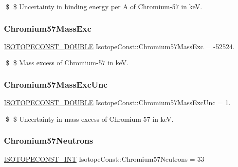 \$ \$ Uncertainty in binding energy per A of Chromium-\/57 in keV. \mbox{\label{group___isotope_const-_chromium-_cr57_ga9b7cb21fc04ce8d3d9797975cf0785dd}} 
\subsubsection{\texorpdfstring{Chromium57\+Mass\+Exc}{Chromium57MassExc}}
{\footnotesize\ttfamily \mbox{\hyperlink{group___isotope_const-_macros_ga8f45a7272ce02c0b4c65c44636ed719a}{I\+S\+O\+T\+O\+P\+E\+C\+O\+N\+S\+T\+\_\+\+D\+O\+U\+B\+LE}} Isotope\+Const\+::\+Chromium57\+Mass\+Exc = -\/52524.}

\$ \$ Mass excess of Chromium-\/57 in keV. \mbox{\label{group___isotope_const-_chromium-_cr57_ga927be74cd2d413a0cb48269a2cf3282c}} 
\subsubsection{\texorpdfstring{Chromium57\+Mass\+Exc\+Unc}{Chromium57MassExcUnc}}
{\footnotesize\ttfamily \mbox{\hyperlink{group___isotope_const-_macros_ga8f45a7272ce02c0b4c65c44636ed719a}{I\+S\+O\+T\+O\+P\+E\+C\+O\+N\+S\+T\+\_\+\+D\+O\+U\+B\+LE}} Isotope\+Const\+::\+Chromium57\+Mass\+Exc\+Unc = 1.}

\$ \$ Uncertainty in mass excess of Chromium-\/57 in keV. \mbox{\label{group___isotope_const-_chromium-_cr57_ga42ac9110bef82c57ed1e1b64e29bc191}} 
\subsubsection{\texorpdfstring{Chromium57\+Neutrons}{Chromium57Neutrons}}
{\footnotesize\ttfamily \mbox{\hyperlink{group___isotope_const-_macros_ga5f18360b3e99483a35c32d789e62621c}{I\+S\+O\+T\+O\+P\+E\+C\+O\+N\+S\+T\+\_\+\+I\+NT}} Isotope\+Const\+::\+Chromium57\+Neutrons = 33}

